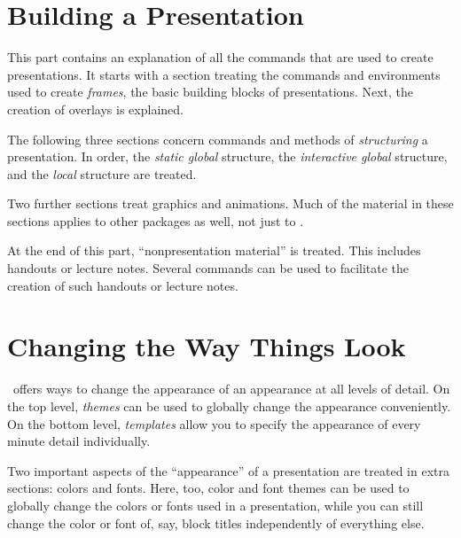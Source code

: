 \documentclass{ltxdoc}
\begin{document}
\part{Building a Presentation}

This part contains an explanation of all the commands that are used to
create presentations. It starts with a section treating the commands
and environments used to create \emph{frames}, the basic building
blocks of presentations. Next, the creation of overlays is
explained.

The following three sections concern commands and methods
of \emph{structuring} a presentation. In order, the \emph{static
  global} structure, the \emph{interactive global} structure, and the
\emph{local} structure are treated.

Two further sections treat graphics and animations. Much of the
material in these sections applies to other packages as well, not just
to \beamer.

At the end of this part, ``nonpresentation material'' is treated. This
includes handouts or lecture notes. Several commands can be used to
facilitate the creation of such handouts or lecture notes.












\part{Changing the Way Things Look}

\beamer\ offers ways to change the appearance of an appearance at all
levels of detail. On the top level, \emph{themes} can be used to
globally change the appearance conveniently. On the bottom level,
\emph{templates} allow you to specify the appearance of every minute
detail individually.

Two important aspects of the ``appearance'' of a presentation are
treated in extra sections: colors and fonts. Here, too, color and
font themes can be used to globally change the colors or fonts used in
a presentation, while you can still change the color or font of, say,
block titles independently of everything else. 





\end{document}
